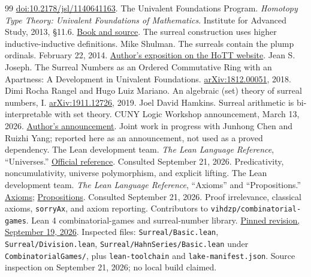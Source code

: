 \documentclass[11pt,letterpaper]{article}
\numberwithin{equation}{section}
\theoremstyle{definition}
\theoremstyle{remark}
\begin{document}
\begin{thebibliography}{99}
\href{https://doi.org/10.2178/jsl/1140641163}{doi:10.2178/jsl/1140641163}.
The Univalent Foundations Program. \emph{Homotopy Type Theory: Univalent Foundations of Mathematics}. Institute for Advanced Study, 2013, \S11.6.
\href{https://homotopytypetheory.org/book/}{Book and source}. The surreal construction uses higher inductive-inductive definitions.
Mike Shulman. The surreals contain the plump ordinals. February 22, 2014.
\href{https://homotopytypetheory.org/2014/02/22/surreals-plump-ordinals/}{Author's exposition on the HoTT website}.
Jean S. Joseph. The Surreal Numbers as an Ordered Commutative Ring with an Apartness: A Development in Univalent Foundations.
\href{https://arxiv.org/abs/1812.00051}{arXiv:1812.00051}, 2018.
Dimi Rocha Rangel and Hugo Luiz Mariano. An algebraic (set) theory of surreal numbers, I.
\href{https://arxiv.org/abs/1911.12726}{arXiv:1911.12726}, 2019.
Joel David Hamkins. Surreal arithmetic is bi-interpretable with set theory. CUNY Logic Workshop announcement, March 13, 2026.
\href{https://jdh.hamkins.org/surreal-arithmetic-cuny-logic-workshop-march-2026/}{Author's announcement}. Joint work in progress with Junhong Chen and Ruizhi Yang; reported here as an announcement, not used as a proved dependency.
The Lean development team. \emph{The Lean Language Reference}, ``Universes.''
\href{https://lean-lang.org/doc/reference/latest/The-Type-System/Universes/}{Official reference}. Consulted September 21, 2026. Predicativity, noncumulativity, universe polymorphism, and explicit lifting.
The Lean development team. \emph{The Lean Language Reference}, ``Axioms'' and ``Propositions.''
\href{https://lean-lang.org/doc/reference/latest/Axioms/}{Axioms};
\href{https://lean-lang.org/doc/reference/latest/The-Type-System/Propositions/}{Propositions}. Consulted September 21, 2026. Proof irrelevance, classical axioms, \texttt{sorryAx}, and axiom reporting.
Contributors to \texttt{vihdzp/combinatorial-games}. Lean 4 combinatorial-games and surreal-number library.
\href{https://github.com/vihdzp/combinatorial-games/tree/02b4a908ea2ecfefffecb438f691951a814a5264}{Pinned revision, September 19, 2026}.
Inspected files: \texttt{Surreal/Basic.lean}, \texttt{Surreal/Division.lean}, \texttt{Surreal/HahnSeries/Basic.lean} under \texttt{CombinatorialGames/}, plus \texttt{lean-toolchain} and \texttt{lake-manifest.json}. Source inspection on September 21, 2026; no local build claimed.

\end{thebibliography}
\end{document}
